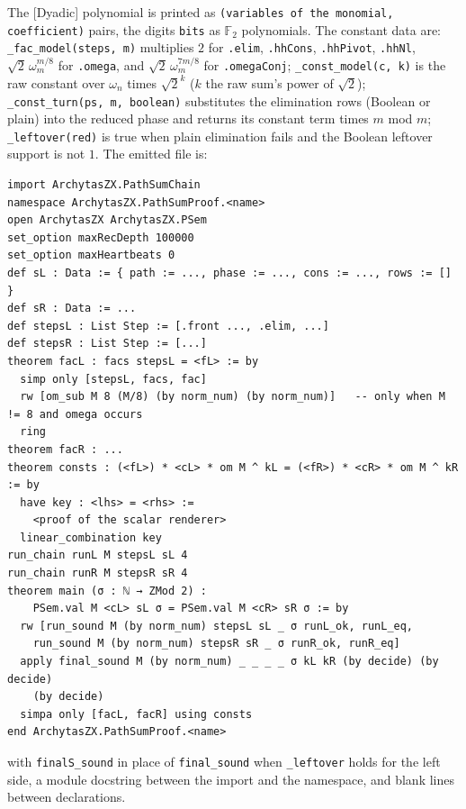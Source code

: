\noindent The [Dyadic] polynomial is printed as \textnormal{\texttt{(\allowbreak{}variables of the monomial,\allowbreak{} coefficient)}}
pairs, the digits \textnormal{\texttt{bits}} as $\mathbb F_2$ polynomials. The constant data are:
\textnormal{\texttt{\_\allowbreak{}fac\_\allowbreak{}model(\allowbreak{}steps,\allowbreak{} m)}} multiplies $2$ for \textnormal{\texttt{.\allowbreak{}elim}}, \textnormal{\texttt{.\allowbreak{}hhCons}}, \textnormal{\texttt{.\allowbreak{}hhPivot}},
\textnormal{\texttt{.\allowbreak{}hhNl}}, $\sqrt2\,\omega_m^{m/8}$ for \textnormal{\texttt{.\allowbreak{}omega}}, and $\sqrt2\,\omega_m^{7m/8}$ for
\textnormal{\texttt{.\allowbreak{}omegaConj}}; \textnormal{\texttt{\_\allowbreak{}const\_\allowbreak{}model(\allowbreak{}c,\allowbreak{} k)}} is the raw constant over $\omega_n$ times
$\sqrt2^{k}$ ($k$ the raw sum's power of $\sqrt2$); \textnormal{\texttt{\_\allowbreak{}const\_\allowbreak{}turn(\allowbreak{}ps,\allowbreak{} m,\allowbreak{} boolean)}} substitutes
the elimination rows (Boolean or plain) into the reduced phase and returns its constant term
times $m$ mod $m$; \textnormal{\texttt{\_\allowbreak{}leftover(\allowbreak{}red)}} is true when plain elimination fails and the Boolean
leftover support is not $1$. The emitted file is:
\begin{lstlisting}[style=lean]
import ArchytasZX.PathSumChain
namespace ArchytasZX.PathSumProof.<name>
open ArchytasZX ArchytasZX.PSem
set_option maxRecDepth 100000
set_option maxHeartbeats 0
def sL : Data := { path := ..., phase := ..., cons := ..., rows := [] }
def sR : Data := ...
def stepsL : List Step := [.front ..., .elim, ...]
def stepsR : List Step := [...]
theorem facL : facs stepsL = <fL> := by
  simp only [stepsL, facs, fac]
  rw [om_sub M 8 (M/8) (by norm_num) (by norm_num)]   -- only when M != 8 and omega occurs
  ring
theorem facR : ...
theorem consts : (<fL>) * <cL> * om M ^ kL = (<fR>) * <cR> * om M ^ kR := by
  have key : <lhs> = <rhs> :=
    <proof of the scalar renderer>
  linear_combination key
run_chain runL M stepsL sL 4
run_chain runR M stepsR sR 4
theorem main (σ : ℕ → ZMod 2) :
    PSem.val M <cL> sL σ = PSem.val M <cR> sR σ := by
  rw [run_sound M (by norm_num) stepsL sL _ σ runL_ok, runL_eq,
    run_sound M (by norm_num) stepsR sR _ σ runR_ok, runR_eq]
  apply final_sound M (by norm_num) _ _ _ _ σ kL kR (by decide) (by decide)
    (by decide)
  simpa only [facL, facR] using consts
end ArchytasZX.PathSumProof.<name>
\end{lstlisting}
with \textnormal{\texttt{finalS\_\allowbreak{}sound}} in place of \textnormal{\texttt{final\_\allowbreak{}sound}} when \textnormal{\texttt{\_\allowbreak{}leftover}} holds for the left
side, a module docstring between the import and the namespace, and blank lines between
declarations.

